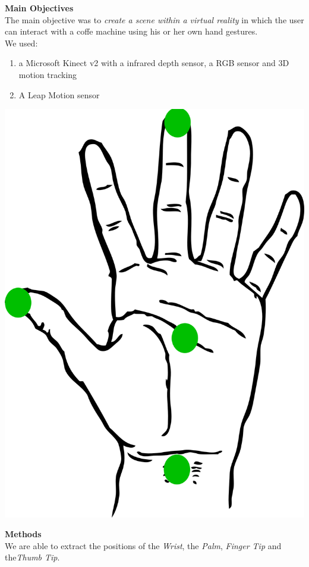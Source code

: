 \documentclass[a0,portrait]{a0poster}
\begin{document}
\begin{multicols}{2}

\color{DarkSlateGray} %

\Huge{\textbf{Main Objectives} }\\[0.25cm]
The main objective was to \emph{create a scene within a virtual reality} in which the user can interact with a coffe machine using his or her own hand gestures. \\
We used:
\begin{enumerate}
\item a Microsoft Kinect v2 with a infrared depth sensor, a RGB sensor and 3D motion tracking
\item A Leap Motion sensor
\end{enumerate}
\begin{center}\vspace{1cm}
\includegraphics[width=0.5\linewidth]{./figures/palm.png}
\end{center}\vspace{1cm}
\color{black}
\Huge{\textbf{Methods} }\\[0.25cm]
We are able to extract the positions of the \emph{Wrist}, the \emph{Palm}, \emph{Finger Tip} and the\emph{Thumb Tip}.\\

\end{multicols}
\end{document}

